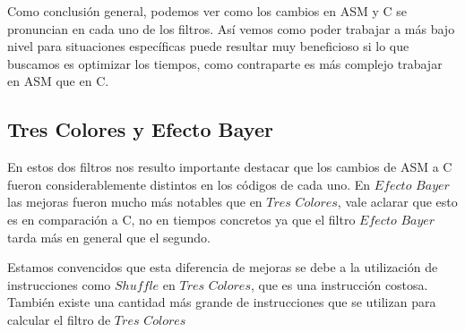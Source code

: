 Como conclusión general, podemos ver como los cambios en ASM y C se pronuncian en cada uno de los filtros. Así vemos como poder trabajar a más bajo nivel para situaciones específicas puede resultar muy beneficioso si lo que buscamos es optimizar los tiempos, como contraparte es más complejo trabajar en ASM que en C.


\subsection{Tres Colores y Efecto Bayer}

En estos dos filtros nos resulto importante destacar que los cambios de ASM a C fueron considerablemente distintos en los códigos de cada uno. En $Efecto$ $Bayer$ las mejoras fueron mucho más notables que en $Tres$ $Colores$, vale aclarar que esto es en comparación a C, no en tiempos concretos ya que el filtro $Efecto$ $Bayer$ tarda más en general que el segundo. 

Estamos convencidos que esta diferencia de mejoras se debe a la utilización de instrucciones como $Shuffle$ en $Tres$ $Colores$, que es una instrucción costosa. También existe una cantidad más grande de instrucciones que se utilizan para calcular el filtro de $Tres$ $Colores$

